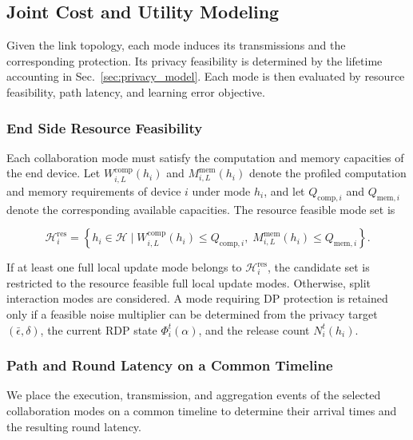 \documentclass[5p,times]{elsarticle}
\theoremstyle{plain}
\theoremstyle{definition}
\theoremstyle{remark}
\begin{document}
\subsection{Joint Cost and Utility Modeling}
\label{sec:cost_utility_model}
Given the link topology, each mode induces its transmissions and the corresponding protection. Its privacy feasibility is determined by the lifetime accounting in Sec.~\ref{sec:privacy_model}. Each mode is then evaluated by resource feasibility, path latency, and learning error objective.
\subsubsection{End Side Resource Feasibility}
\label{sec:end_resource}

Each collaboration mode must satisfy the computation and memory capacities
of the end device. Let \(W_{i,L}^{\mathrm{comp}}(h_i)\) and
\(M_{i,L}^{\mathrm{mem}}(h_i)\) denote the profiled computation and memory
requirements of device \(i\) under mode \(h_i\), and let
\(Q_{\mathrm{comp},i}\) and \(Q_{\mathrm{mem},i}\) denote the corresponding
available capacities. The resource feasible mode set is

\begin{equation}
\mathcal H_i^{\mathrm{res}}
=
\left\{
h_i\in\mathcal H
\mid
W_{i,L}^{\mathrm{comp}}(h_i)\le Q_{\mathrm{comp},i},
\;
M_{i,L}^{\mathrm{mem}}(h_i)\le Q_{\mathrm{mem},i}
\right\}.
\label{eq:resource_feasible}
\end{equation}

If at least one full local update mode belongs to
\(\mathcal H_i^{\mathrm{res}}\), the candidate set
is restricted to the resource feasible full local
update modes. Otherwise, split interaction modes
are considered. A mode requiring DP protection is retained only
if a feasible noise multiplier can be determined
from the privacy target \((\bar\epsilon,\delta)\),
the current RDP state \(\Phi_i^t(\alpha)\),
and the release count \(N_i^t(h_i)\).
\subsubsection{Path and Round Latency on a Common Timeline}
We place the execution, transmission, and
aggregation events of the selected collaboration
modes on a common timeline to determine their
arrival times and the resulting round latency.
\end{document}
